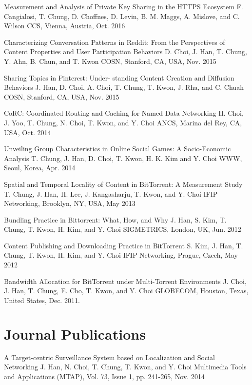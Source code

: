 \documentclass[11pt,a4paper,sans]{moderncv}        %
\begin{document}
{Measurement and Analysis of Private Key Sharing in the HTTPS Ecosystem}
{F. Cangialosi, \textcolor{colortj}{T. Chung}, D. Choffnes, D. Levin, B. M. Maggs, A. Mislove, and C. Wilson}
{CCS, Vienna, Austria, Oct. 2016}

{Characterizing Conversation Patterns in Reddit: From the Perspectives of Content Properties and User Participation Behaviors}
{D. Choi, J. Han, \textcolor{colortj}{T. Chung}, Y. Ahn, B. Chun, and T. Kwon}
{COSN, Stanford, CA, USA, Nov. 2015}


{Sharing Topics in Pinterest: Under- standing Content Creation and Diffusion Behaviors}
{J. Han, D. Choi, A. Choi, \textcolor{colortj}{T. Chung}, T. Kwon, J. Rha, and C. Chuah}
{COSN, Stanford, CA, USA, Nov. 2015}


{CoRC: Coordinated Routing and Caching for Named Data Networking}
{H. Choi, J. Yoo, \textcolor{colortj}{T. Chung}, N. Choi, T. Kwon, and Y. Choi}
{ANCS, Marina del Rey, CA, USA, Oct. 2014 }

{Unveiling Group Characteristics in Online Social Games: A Socio-Economic Analysis}
{\textcolor{colortj}{T. Chung}, J. Han, D. Choi, T. Kwon, H. K. Kim and Y. Choi}
{WWW, Seoul, Korea, Apr. 2014}

{Spatial and Temporal Locality of Content in BitTorrent: A Measurement Study}
{\textcolor{colortj}{T. Chung}, J. Han, H. Lee, J. Kangasharju, T. Kwon, and Y. Choi}
{IFIP Networking, Brooklyn, NY, USA, May 2013 }

{Bundling Practice in Bittorrent: What, How, and Why}
{J. Han, S. Kim, \textcolor{colortj}{T. Chung}, T. Kwon, H. Kim, and Y. Choi}
{SIGMETRICS, London, UK, Jun. 2012}

{Content Publishing and Downloading Practice in BitTorrent}
{S. Kim, J. Han, \textcolor{colortj}{T. Chung}, T. Kwon, H. Kim, and Y. Choi}
{IFIP Networking, Prague, Czech, May 2012}

{Bandwidth Allocation for BitTorrent under Multi-Torrent Environments}
{J. Choi, J. Han, \textcolor{colortj}{T. Chung}, E. Cho, T. Kwon, and Y. Choi}
{GLOBECOM, Houston, Texas, United States, Dec. 2011}. 

\section{Journal Publications}
\publication{}
{A Target-centric Surveillance System based on Localization and Social Networking
}
{J. Han, N. Choi, \textcolor{colortj}{T. Chung}, T. Kwon, and Y. Choi}
{Multimedia Tools and Applications (MTAP), Vol. 73, Issue 1, pp. 241-265, Nov. 2014}
\end{document}
